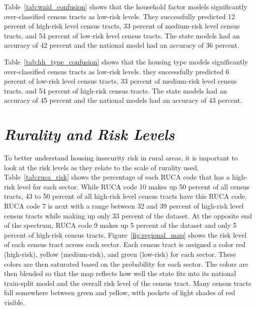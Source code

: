  

Table~\ref{tab:waid_confusion} shows that the household factor models significantly over-classified census tracts as low-risk levels. They successfully predicted 12 percent of high-risk level census tracts, 33 percent of medium-risk level census tracts, and 54 percent of low-risk level census tracts. The state models had an accuracy of 42 percent and the national model had an accuracy of 36 percent. 



Table~\ref{tab:hh_type_confusion} shows that the housing type models significantly over-classified census tracts as low-risk levels. they successfully predicted 6 percent of low-risk level census tracts, 33 percent of medium-risk level census tracts, and 54 percent of high-risk census tracts. The state models had an accuracy of 45 percent and the national models had an accuracy of 43 percent. 



\section{\textit{Rurality and Risk Levels}}
To better understand housing insecurity risk in rural areas, it is important to look at the risk levels as they relate to the scale of rurality used. Table~\ref{tab:ruca_risk} shows the percentage of each RUCA code that has a high-risk level for each sector. While RUCA code 10 makes up 50 percent of all census tracts, 43 to 50 percent of all high-risk level census tracts have this RUCA code. RUCA code 7 is next with a range between 32 and 39 percent of high-risk level census tracts while making up only 33 percent of the dataset. At the opposite end of the spectrum, RUCA code 9 makes up 5 percent of the dataset and only 5 percent of high-risk census tracts. Figure~\ref{fig:regional_map} shows the risk level of each census tract across each sector. Each census tract is assigned a color red (high-risk), yellow (medium-risk), and green (low-risk) for each sector. These colors are then saturated based on the probability for each sector. The colors are then blended so that the map reflects how well the state fits into its national train-split model and the overall risk level of the census tract. Many census tracts fall somewhere between green and yellow, with pockets of light shades of red visible. 

